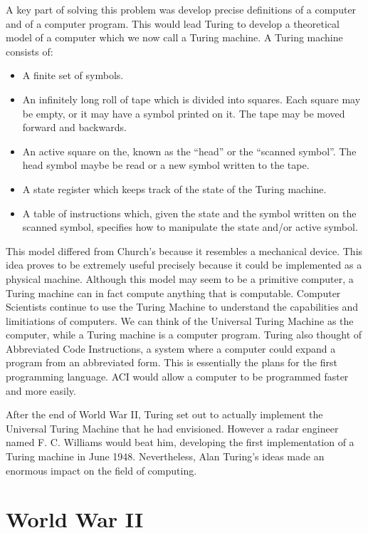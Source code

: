\documentclass[12pt]{article}
\theoremstyle{mystyle}
\begin{document}
A key part of solving this problem was develop precise definitions of a
computer and of a computer program. This would lead Turing to develop a
theoretical model of a computer which we now call a Turing machine. A Turing
machine consists of:
\begin{itemize}
  \item A finite set of symbols.
  \item An infinitely long roll of tape which is divided into squares. Each
    square may be empty, or it may have a symbol printed on it. The tape may be
    moved forward and backwards.
  \item An active square on the, known as the ``head'' or the ``scanned
    symbol''. The head symbol maybe be read or a new symbol written to the tape.
  \item A state register which keeps track of the state of the Turing machine.
  \item A table of instructions which, given the state and the symbol written on
    the scanned symbol, specifies how to manipulate the state and/or active
    symbol.
\end{itemize}
This model differed from Church's because it resembles a mechanical device. This
idea proves to be extremely useful precisely because it could be implemented as
a physical machine. Although this model may seem to be a primitive computer, a
Turing machine can in fact compute anything that is computable. Computer
Scientists continue to use the Turing Machine to understand the capabilities and
limitiations of computers. We can think of the Universal Turing Machine as the
computer, while a Turing machine is a computer program. Turing also thought of
Abbreviated Code Instructions, a system where a computer could expand a program
from an abbreviated form. This is essentially the plans for the first
programming language. ACI would allow a computer to be programmed faster and
more easily.

After the end of World War II, Turing set out to actually implement the
Universal Turing Machine that he had envisioned. However a radar engineer named 
F. C. Williams would beat him, developing the first implementation of a 
Turing machine in June 1948. Nevertheless, Alan Turing's ideas made an enormous
impact on the field of computing.


\section{World War II}
\end{document}
